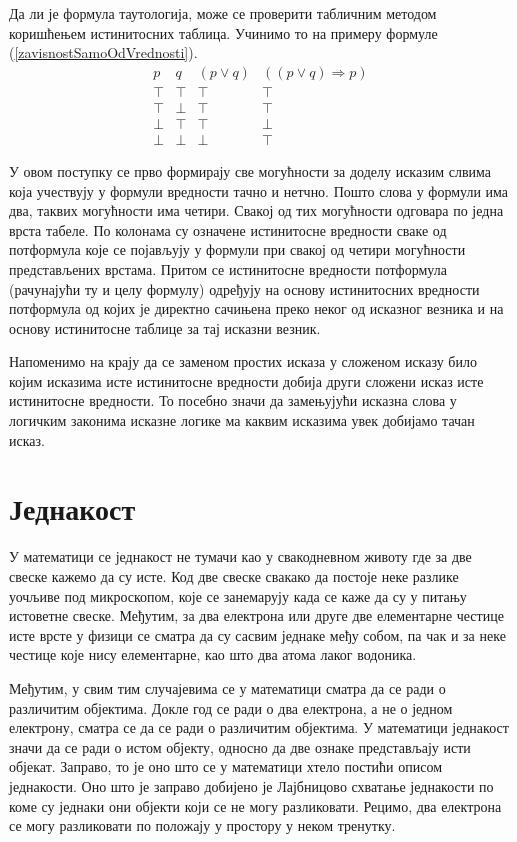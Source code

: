 \documentclass[a4paper]{book}
\begin{document}
Да ли је формула таутологија, може се проверити табличним методом коришћењем истинитосних таблица.
Учинимо то на примеру формуле (\ref{zavisnostSamoOdVrednosti}).
$$
\begin{array}{c|c|c|c}
p & q & (p\lor q) & ((p\lor q)\Rightarrow p)
\\
\hline
\top & \top & \top & \top
\\
\top & \bot & \top & \top
\\
\bot & \top & \top & \bot
\\
\bot & \bot & \bot & \top
\end{array}
$$

У овом поступку се прво формирају све могућности за доделу исказим слвима која учествују у формули
вредности тачно и нетчно. Пошто слова у формули има два, таквих могућности има четири.
Свакој од тих могућности одговара по једна врста табеле. По колонама су означене истинитосне вредности
сваке од потформула које се појављују у формули при свакој од четири могућности представљених врстама.
Притом се истинитосне вредности потформула (рачунајући ту и целу формулу) одређују на основу
истинитосних вредности потформула од којих је директно сачињена преко неког од исказног везника
и на основу истинитосне таблице за тај исказни везник.

Напоменимо на крају да се заменом простих исказа у сложеном исказу било којим исказима исте исти\-ни\-то\-сне вредности
добија други сложени исказ исте истинитосне вре\-дно\-сти. То посебно значи да замењујући исказна слова
у логичким законима исказне логике ма каквим исказима увек добијамо тачан исказ.

\section{Једнакост}

\indent

У математици се једнакост не тумачи као у свакодневном животу где за две свеске кажемо да су исте.
Код две свеске свакако да постоје неке разлике уочљиве под ми\-кро\-ско\-пом, које се занемарују када се
каже да су у питању истоветне свеске. Међутим, за два електрона или друге две елементарне честице
исте врсте у физици се сматра да су сасвим једнаке међу собом, па чак и за неке честице које нису
елементарне, као што два атома лаког водоника.

Међутим, у свим тим случајевима се у математици сматра да се ради о различитим објектима. Докле год се ради
о два електрона, а не о једном електрону, сматра се да се ради о различитим објектима.
У математици једнакост значи да се ради о истом објекту, односно да две ознаке представљају исти објекат.
Заправо, то је оно што се у математици хтело постићи описом једнакости. Оно што је заправо добијено
је Лајбницово схватање једнакости по коме су једнаки они објекти који се не могу разликовати.
Рецимо, два електрона се могу разликовати по положају у простору у неком тренутку.
\end{document}
